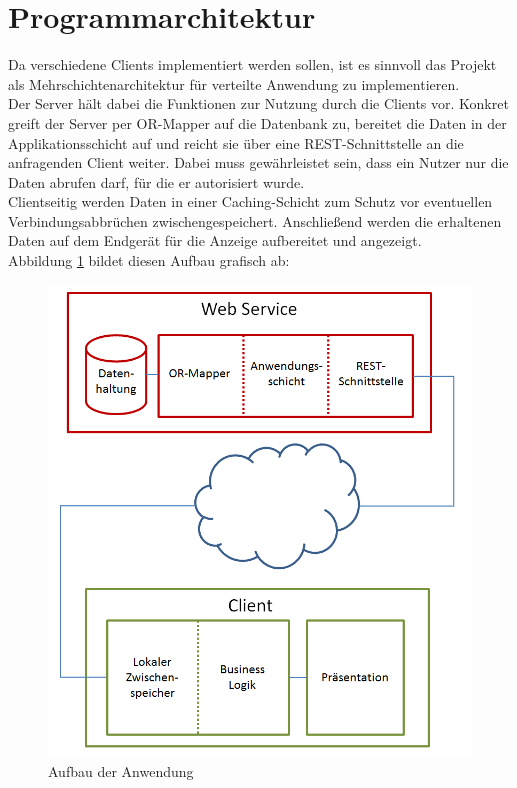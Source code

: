 \section{Programmarchitektur}
\label{sec:programmarchitektur}
Da verschiedene Clients implementiert werden sollen, ist es sinnvoll das Projekt als Mehrschichtenarchitektur für verteilte Anwendung zu implementieren. \\
Der Server hält dabei die Funktionen zur Nutzung durch die Clients vor. Konkret greift der Server per OR-Mapper auf die Datenbank zu, bereitet die Daten in der Applikationsschicht auf und reicht sie über eine REST-Schnittstelle an die anfragenden Client weiter. Dabei muss gewährleistet sein, dass ein Nutzer nur die Daten abrufen darf, für die er autorisiert wurde. \\
Clientseitig werden Daten in einer Caching-Schicht zum Schutz vor eventuellen Verbindungsabbrüchen zwischengespeichert. Anschließend werden die erhaltenen Daten auf dem Endgerät für die Anzeige aufbereitet und angezeigt. \\
Abbildung \ref{pic:architecture} bildet diesen Aufbau grafisch ab:
\begin{figure}[h]
\centering
\includegraphics[width=0.7\linewidth]{content/images/Aufbau-Architektur.png}
\caption{Aufbau der Anwendung}
\label{pic:architecture}
\end{figure}

\newpage
